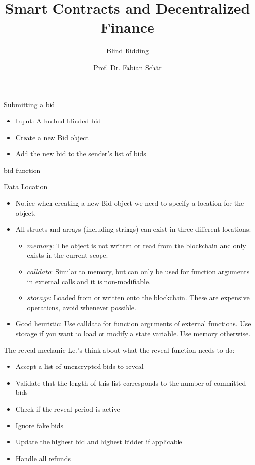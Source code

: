 \documentclass[]{beamer}
\title{Smart Contracts and Decentralized Finance}
\subtitle{Blind Bidding}
\author{Prof. Dr. Fabian Schär}
\institute{University of Basel}
\begin{document}
\thispagestyle{empty}
\begin{frame}[noframenumbering]
	\titlepage
\end{frame}

\begin{frame}{Submitting a bid}

	\begin{itemize}
		\item Input: A hashed blinded bid
		\item Create a new Bid object
		\item Add the new bid to the sender's list of bids
	\end{itemize}

	\begin{samplecode}{bid function}
		
	\end{samplecode}
\end{frame}

\begin{frame}{Data Location}
	\begin{itemize}
		\item Notice when creating a new Bid object we need to specify a location for the object.
		\item All structs and arrays (including strings) can exist in three different locations:
		\begin{itemize}
			\item $memory$: The object is not written or read from the blockchain and only exists in the current scope.
			\item $calldata$: Similar to memory, but can only be used for function arguments in external calls and it is non-modifiable.
			\item $storage$: Loaded from or written onto the blockchain. These are expensive operations, avoid whenever possible.
		\end{itemize}		
		\item Good heuristic: Use calldata for function arguments of external functions. Use storage if you want to load or modify a state variable. Use memory otherwise.
	\end{itemize}

\end{frame}

\begin{frame}{The reveal mechanic}
	Let's think about what the reveal function needs to do:
	\begin{itemize}
		\item Accept a list of unencrypted bids to reveal
		\item Validate that the length of this list corresponds to the number of committed bids
		\item Check if the reveal period is active
		\item Ignore fake bids
		\item Update the highest bid and highest bidder if applicable
		\item Handle all refunds
	\end{itemize}

\end{frame}
\end{document}
